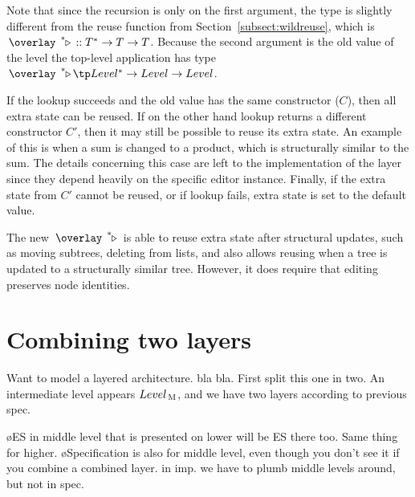 Note that since the recursion is only on the first argument, the type is slightly different from the reuse function from Section~\ref{subsect:wildreuse}, which is $\reuzestar ::  T^* \to T \to T$. Because the second argument is the old value of the level the top-level application has type $\reuzestar \tp Level^* \to Level \to Level$.

If the lookup succeeds and the old value has the same constructor ($C$), then all extra state can be reused. If on the other hand lookup returns a different constructor $C'$, then it may still be possible to reuse its extra state. An example of this is when a sum is changed to a product, which is structurally similar to the sum. The details concerning this case are left to the implementation of the layer since they depend heavily on the specific editor instance. Finally, if the extra state from $C'$ cannot be reused, or if lookup fails, extra state is set to the default value.

The new $\reuzestar$ is able to reuse extra state after structural updates, such as moving subtrees, deleting from lists, and also allows reusing when a tree is updated to a structurally similar tree. However, it does require that editing preserves node identities. 




%
%






%																
%																
%																
\section{Combining two layers}  \label{sect:combinedExtra}

\toHere

Want to model a layered architecture. bla bla. First split this one in two. An intermediate level appears $Level_{\, \mathrm M}$, and we have two layers according to previous spec. 

\bl
\o ES in middle level that is presented on lower will be ES there too. Same thing for higher.
\o Specification is also for middle level, even though you don't see it if you combine a  combined layer. in imp. we have to plumb middle levels around, but not in spec.
\el

